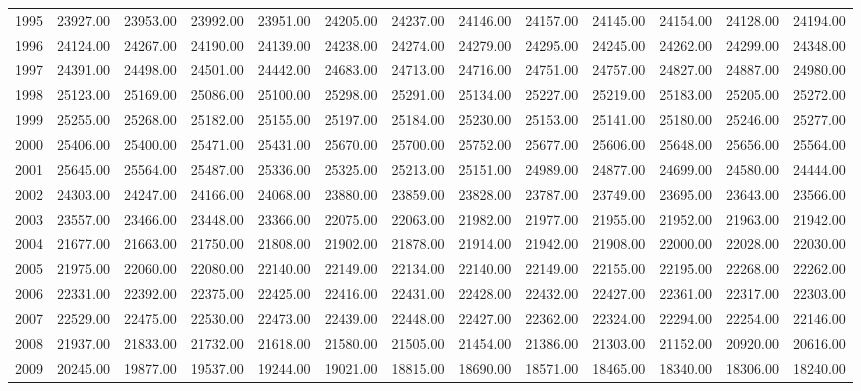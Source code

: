 \begin{longtable}{rrrrrrrrrrrrr}
  1995 & 23927.00 & 23953.00 & 23992.00 & 23951.00 & 24205.00 & 24237.00 & 24146.00 & 24157.00 & 24145.00 & 24154.00 & 24128.00 & 24194.00 \\ 
  1996 & 24124.00 & 24267.00 & 24190.00 & 24139.00 & 24238.00 & 24274.00 & 24279.00 & 24295.00 & 24245.00 & 24262.00 & 24299.00 & 24348.00 \\ 
  1997 & 24391.00 & 24498.00 & 24501.00 & 24442.00 & 24683.00 & 24713.00 & 24716.00 & 24751.00 & 24757.00 & 24827.00 & 24887.00 & 24980.00 \\ 
  1998 & 25123.00 & 25169.00 & 25086.00 & 25100.00 & 25298.00 & 25291.00 & 25134.00 & 25227.00 & 25219.00 & 25183.00 & 25205.00 & 25272.00 \\ 
  1999 & 25255.00 & 25268.00 & 25182.00 & 25155.00 & 25197.00 & 25184.00 & 25230.00 & 25153.00 & 25141.00 & 25180.00 & 25246.00 & 25277.00 \\ 
  2000 & 25406.00 & 25400.00 & 25471.00 & 25431.00 & 25670.00 & 25700.00 & 25752.00 & 25677.00 & 25606.00 & 25648.00 & 25656.00 & 25564.00 \\ 
  2001 & 25645.00 & 25564.00 & 25487.00 & 25336.00 & 25325.00 & 25213.00 & 25151.00 & 24989.00 & 24877.00 & 24699.00 & 24580.00 & 24444.00 \\ 
  2002 & 24303.00 & 24247.00 & 24166.00 & 24068.00 & 23880.00 & 23859.00 & 23828.00 & 23787.00 & 23749.00 & 23695.00 & 23643.00 & 23566.00 \\ 
  2003 & 23557.00 & 23466.00 & 23448.00 & 23366.00 & 22075.00 & 22063.00 & 21982.00 & 21977.00 & 21955.00 & 21952.00 & 21963.00 & 21942.00 \\ 
  2004 & 21677.00 & 21663.00 & 21750.00 & 21808.00 & 21902.00 & 21878.00 & 21914.00 & 21942.00 & 21908.00 & 22000.00 & 22028.00 & 22030.00 \\ 
  2005 & 21975.00 & 22060.00 & 22080.00 & 22140.00 & 22149.00 & 22134.00 & 22140.00 & 22149.00 & 22155.00 & 22195.00 & 22268.00 & 22262.00 \\ 
  2006 & 22331.00 & 22392.00 & 22375.00 & 22425.00 & 22416.00 & 22431.00 & 22428.00 & 22432.00 & 22427.00 & 22361.00 & 22317.00 & 22303.00 \\ 
  2007 & 22529.00 & 22475.00 & 22530.00 & 22473.00 & 22439.00 & 22448.00 & 22427.00 & 22362.00 & 22324.00 & 22294.00 & 22254.00 & 22146.00 \\ 
  2008 & 21937.00 & 21833.00 & 21732.00 & 21618.00 & 21580.00 & 21505.00 & 21454.00 & 21386.00 & 21303.00 & 21152.00 & 20920.00 & 20616.00 \\ 
  2009 & 20245.00 & 19877.00 & 19537.00 & 19244.00 & 19021.00 & 18815.00 & 18690.00 & 18571.00 & 18465.00 & 18340.00 & 18306.00 & 18240.00 \\ 

\end{longtable}
